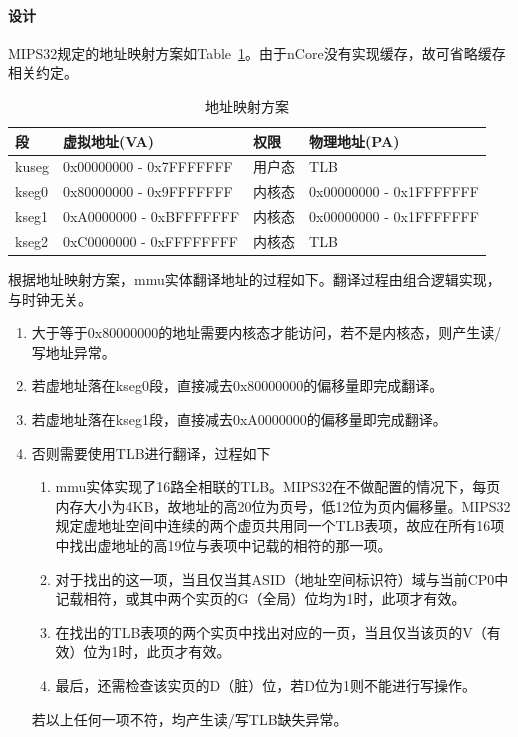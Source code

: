\documentclass{article}
\begin{document}
\begin{spacing}{1.4}
\paragraph{设计}\mbox{}

MIPS32规定的地址映射方案如Table~\ref{tb:mem-map}。由于nCore没有实现缓存，故可省略缓存相关约定。
\begin{table}[!htb]
\begin{center}
\begin{tabular*}{15cm}{l|l|l|l}
\hline
\textbf{段}&\textbf{虚拟地址(VA)}&\textbf{权限}&\textbf{物理地址(PA)} \\
\hline kuseg & 0x00000000 - 0x7FFFFFFF & 用户态 & TLB \\
\hline kseg0 & 0x80000000 - 0x9FFFFFFF & 内核态 & 0x00000000 - 0x1FFFFFFF \\
\hline kseg1 & 0xA0000000 - 0xBFFFFFFF & 内核态 & 0x00000000 - 0x1FFFFFFF \\
\hline kseg2 & 0xC0000000 - 0xFFFFFFFF & 内核态 & TLB \\
\hline
\end{tabular*}
\caption{地址映射方案}
\label{tb:mem-map}
\end{center}
\end{table}

根据地址映射方案，mmu实体翻译地址的过程如下。翻译过程由组合逻辑实现，与时钟无关。

\begin{enumerate}
    \item 大于等于0x80000000的地址需要内核态才能访问，若不是内核态，则产生读/写地址异常。
    \item 若虚地址落在kseg0段，直接减去0x80000000的偏移量即完成翻译。
    \item 若虚地址落在kseg1段，直接减去0xA0000000的偏移量即完成翻译。
    \item 否则需要使用TLB进行翻译，过程如下
    \begin{enumerate}
        \item mmu实体实现了16路全相联的TLB。MIPS32在不做配置的情况下，每页内存大小为4KB，故地址的高20位为页号，低12位为页内偏移量。MIPS32规定虚地址空间中连续的两个虚页共用同一个TLB表项，故应在所有16项中找出虚地址的高19位与表项中记载的相符的那一项。
        \item 对于找出的这一项，当且仅当其ASID（地址空间标识符）域与当前CP0中记载相符，或其中两个实页的G（全局）位均为1时，此项才有效。
        \item 在找出的TLB表项的两个实页中找出对应的一页，当且仅当该页的V（有效）位为1时，此页才有效。
        \item 最后，还需检查该实页的D（脏）位，若D位为1则不能进行写操作。
    \end{enumerate}
    若以上任何一项不符，均产生读/写TLB缺失异常。
\end{enumerate}


\end{spacing}
\end{document}
